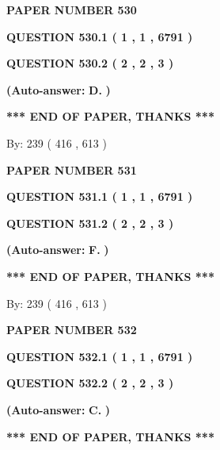 \documentclass[12pt]{article}
\begin{document}
   
 {\textbf{ \Large{ PAPER NUMBER  530  }}}
   
   
   
   
  
  
{\textbf{\large{QUESTION
530.1 
 ( 1 , 1 , 6791 )
}}}
  
  
{\textbf{\large{QUESTION
530.2 
 ( 2 , 2 , 3 )
}}}
 
 
{\textbf{(Auto-answer:}}
{\textbf{\large{
D.}}}
{\textbf{)}}
 
 
   
   
   
   
\vspace{1.0in} 
{\textbf{\large{ *** END OF PAPER, THANKS *** }}} 
   
   
\hspace{1.0in} By: 
 239 ( 416 ,  613 )
   
   
   
   
\newpage 
\setcounter{page}{ 
   531001 } 
   
   
 {\textbf{ \Large{ PAPER NUMBER  531  }}}
   
   
   
   
  
  
{\textbf{\large{QUESTION
531.1 
 ( 1 , 1 , 6791 )
}}}
  
  
{\textbf{\large{QUESTION
531.2 
 ( 2 , 2 , 3 )
}}}
 
 
{\textbf{(Auto-answer:}}
{\textbf{\large{
F.}}}
{\textbf{)}}
 
 
   
   
   
   
\vspace{1.0in} 
{\textbf{\large{ *** END OF PAPER, THANKS *** }}} 
   
   
\hspace{1.0in} By: 
 239 ( 416 ,  613 )
   
   
   
   
\newpage 
\setcounter{page}{ 
   532001 } 
   
   
 {\textbf{ \Large{ PAPER NUMBER  532  }}}
   
   
   
   
  
  
{\textbf{\large{QUESTION
532.1 
 ( 1 , 1 , 6791 )
}}}
  
  
{\textbf{\large{QUESTION
532.2 
 ( 2 , 2 , 3 )
}}}
 
 
{\textbf{(Auto-answer:}}
{\textbf{\large{
C.}}}
{\textbf{)}}
 
 
   
   
   
   
\vspace{1.0in} 
{\textbf{\large{ *** END OF PAPER, THANKS *** }}} 
   
\end{document}

